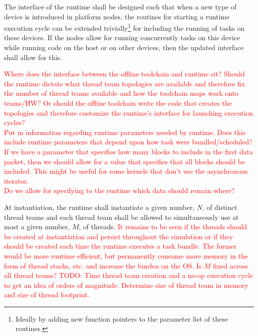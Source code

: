 \documentclass{article}
\begin{document}
\begin{req}
The interface of the runtime shall be designed such  that when a new type of
device is introduced in platform nodes, the routines for starting a runtime
execution cycle can be extended trivially\footnote{Ideally by adding new function
pointers to the parameter list of these routines.} for including the running of
tasks on these devices.  If the nodes allow for running concurrently tasks on
this device while running code on the host or on other devices, then the updated
interface shall allow for this.
\end{req}

\textcolor{red}{Where does the interface between the offline toolchain and
runtime sit?  Should the runtime dictate what thread team topologies are
available and therefore fix the number of thread teams available and how the
toolchain maps work onto teams/HW?  Or should the offline toolchain write the
code that creates the topologies and therefore customize the runtime's interface
for launching execution cycles?}\\

\textcolor{red}{Put in information regarding runtime parameters needed by
runtime.  Does this include runtime parameters that depend upon how task were
bundled/scheduled?  If we have a parameter that specifies how many blocks to
include in the first data packet, then we should allow for a value that
specifies that all blocks should be included.  This might be useful for some
kernels that don't use the asynchronous iterator.}\\

\textcolor{red}{Do we allow for specifying to the runtime which data should
remain where?}

\begin{req}
At instantiation, the runtime shall instantiate a given number, $N$, of distinct
thread teams and each thread team shall be allowed to simultaneously use
at most a given number, $M$, of threads.  \textcolor{red}{It remains to be seen
if the threads should be created at instantiation and persist throughout the
simulation or if they should be created each time the runtime executes a task
bundle.  The former would be more runtime efficient, but permanently consume
more memory in the form of thread stacks, etc. and increase the burden on the
OS.  Is $M$ fixed across all thread teams?  TODO: Time thread team creation and
a no-op execution cycle to get an idea of orders of magnitude.  Determine size
of thread team in memory and size of thread footprint.}
\end{req}
\end{document}
